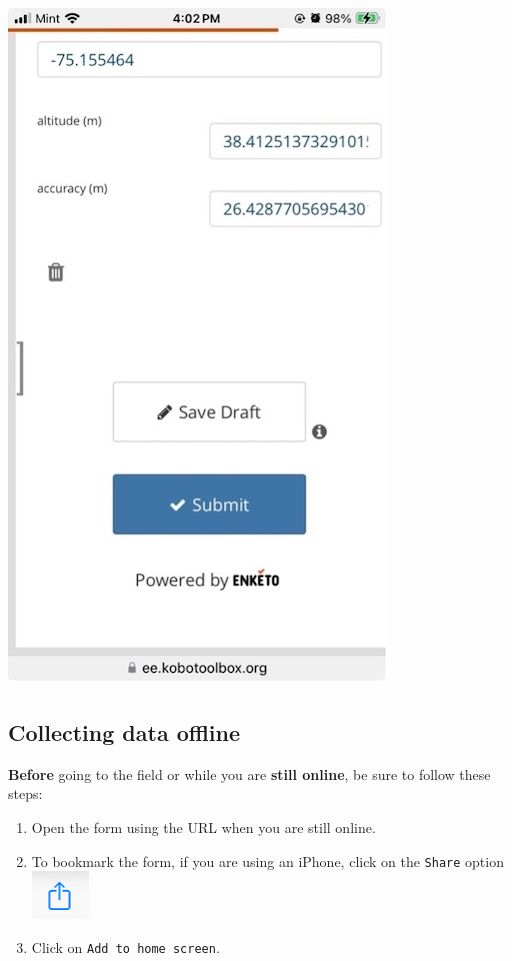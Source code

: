 \documentclass[
  letterpaper,
  DIV=11,
  numbers=noendperiod]{scrartcl}
\begin{document}
\includegraphics{kobotoolbox_tutorial_files/img/img18.jpg}

\subsection{Collecting data offline}\label{collecting-data-offline}

\textbf{Before} going to the field or while you are \textbf{still
online}, be sure to follow these steps:

\begin{enumerate}
\def\labelenumi{\arabic{enumi}.}
\item
  Open the form using the URL when you are still online.
\item
  To bookmark the form, if you are using an iPhone, click on the
  \texttt{Share} option
  \includegraphics{kobotoolbox_tutorial_files/img/img20.png}
\item
  Click on \texttt{Add\ to\ home\ screen}.
\end{enumerate}
\end{document}

